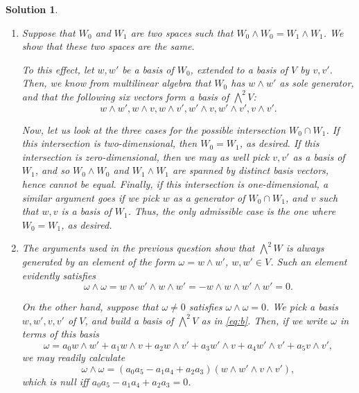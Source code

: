 \documentclass{article}
\theoremstyle{nonumberplain}
\newtheorem{sol}{Solution}
\begin{document}
\begin{sol}
\begin{enumerate}
\item Suppose that $W_0$ and $W_1$ are two spaces such that $W_0 \wedge W_0 = W_1 \wedge W_1$. We show that these two spaces are the same.

To this effect, let $w,w'$ be a basis of $W_0$, extended to a basis of $V$ by $v,v'$. Then, we know from multilinear algebra that $W_0$ has $w \wedge w'$ as sole generator, and that the following six vectors form a basis of $\bigwedge^2 V$:
\begin{equation}\label{eq:b}
w \wedge w', w \wedge v, w \wedge v', w' \wedge v, w' \wedge v', v \wedge v'.
\end{equation}

Now, let us look at the three cases for the possible intersection $W_0 \cap W_1$. If this intersection is two-dimensional, then $W_0 = W_1$, as desired. If this intersection is zero-dimensional, then we may as well pick $v, v'$ as a basis of $W_1$, and so $W_0 \wedge W_0$ and $W_1 \wedge W_1$ are spanned by distinct basis vectors, hence cannot be equal. Finally, if this intersection is one-dimensional, a similar argument goes if we pick $w$ as a generator of $W_0 \cap W_1$, and $v$ such that $w,v$ is a basis of $W_1$. Thus, the only admissible case is the one where $W_0 = W_1$, as desired.
\item The arguments used in the previous question show that $\bigwedge^2 W$ is always generated by an element of the form $\omega = w \wedge w'$, $w, w' \in V$. Such an element evidently satisfies
\begin{equation}
\omega \wedge \omega = w \wedge w' \wedge w \wedge w' = - w \wedge w \wedge w' \wedge w' = 0.
\end{equation}

On the other hand, suppose that $\omega \neq 0$ satisfies $\omega \wedge \omega = 0$. We pick a basis $w,w',v,v'$ of $V$, and build a basis of $\bigwedge^2 V$ as in \eqref{eq:b}. Then, if we write $\omega$ in terms of this basis
\begin{equation}
\omega = a_0 w \wedge w' + a_1 w \wedge v + a_2 w \wedge v' + a_3 w' \wedge v + a_4 w' \wedge v' + a_5 v \wedge v',
\end{equation}
we may readily calculate
\begin{equation}
\omega \wedge \omega = (a_0 a_5 - a_1 a_4 + a_2 a_3) (w \wedge w' \wedge v \wedge v'),
\end{equation}
which is null iff $a_0 a_5 - a_1 a_4 + a_2 a_3 = 0$.


\end{enumerate}
\end{sol}
\end{document}
